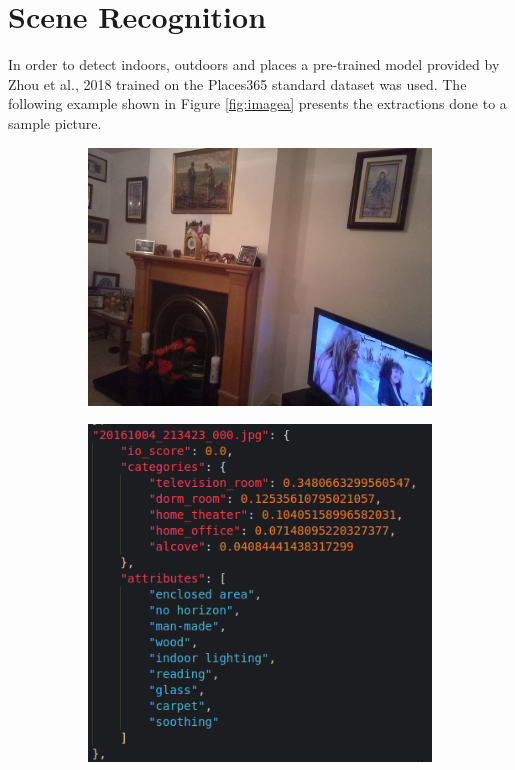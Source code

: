 \section{Scene Recognition}
\label{sec:scene_recognition}
  In order to detect indoors, outdoors and places a pre-trained model provided by Zhou et al., 2018 \cite{Zhou2018}  trained on the Places365 standard dataset was used. The following example shown in Figure \ref{fig:imagea} presents the extractions done to a sample picture. 

  \begin{figure}[H]
    \centering
    \captionsetup{justification=centering}

    \begin{subfigure}{0.525\textwidth}
    
    \includegraphics[width=\textwidth]{Sections/4InitialWork/4_images_random/dataset_place.jpg} 
    \caption{}
    \end{subfigure}
    \begin{subfigure}{0.4\textwidth}
    \includegraphics[width=\textwidth]{Sections/4InitialWork/4_images_random/places_detect.png}

\end{subfigure}
\end{figure}
